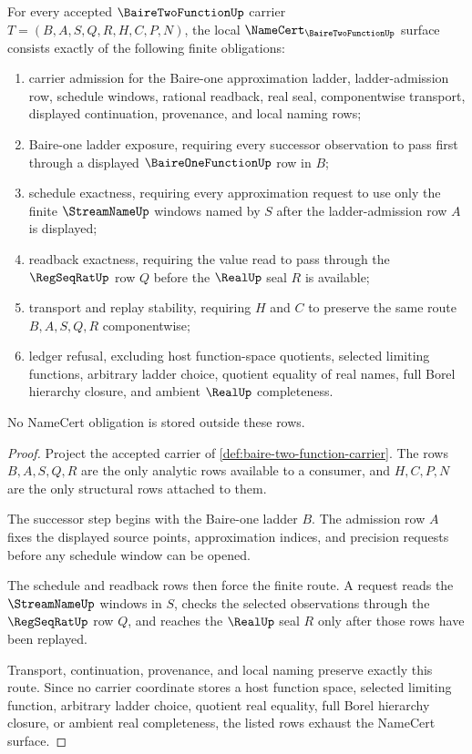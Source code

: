 \begin{theorem}
\label{thm:baire-two-function-namecert-obligations}
For every accepted $\BaireTwoFunctionUp$ carrier $T=(B,A,S,Q,R,H,C,P,N)$, the local $\NameCert_{\BaireTwoFunctionUp}$ surface consists exactly of the following finite obligations:
\begin{enumerate}
\item carrier admission for the Baire-one approximation ladder, ladder-admission row, schedule windows, rational readback, real seal, componentwise transport, displayed continuation, provenance, and local naming rows;
\item Baire-one ladder exposure, requiring every successor observation to pass first through a displayed $\BaireOneFunctionUp$ row in $B$;
\item schedule exactness, requiring every approximation request to use only the finite $\StreamNameUp$ windows named by $S$ after the ladder-admission row $A$ is displayed;
\item readback exactness, requiring the value read to pass through the $\RegSeqRatUp$ row $Q$ before the $\RealUp$ seal $R$ is available;
\item transport and replay stability, requiring $H$ and $C$ to preserve the same route $B,A,S,Q,R$ componentwise;
\item ledger refusal, excluding host function-space quotients, selected limiting functions, arbitrary ladder choice, quotient equality of real names, full Borel hierarchy closure, and ambient $\RealUp$ completeness.
\end{enumerate}
No NameCert obligation is stored outside these rows.
\end{theorem}
\begin{proof}
Project the accepted carrier of \autoref{def:baire-two-function-carrier}. The rows $B,A,S,Q,R$ are the only analytic rows available to a consumer, and $H,C,P,N$ are the only structural rows attached to them.

The successor step begins with the Baire-one ladder $B$. The admission row $A$ fixes the displayed source points, approximation indices, and precision requests before any schedule window can be opened.

The schedule and readback rows then force the finite route. A request reads the $\StreamNameUp$ windows in $S$, checks the selected observations through the $\RegSeqRatUp$ row $Q$, and reaches the $\RealUp$ seal $R$ only after those rows have been replayed.

Transport, continuation, provenance, and local naming preserve exactly this route. Since no carrier coordinate stores a host function space, selected limiting function, arbitrary ladder choice, quotient real equality, full Borel hierarchy closure, or ambient real completeness, the listed rows exhaust the NameCert surface.
\end{proof}

